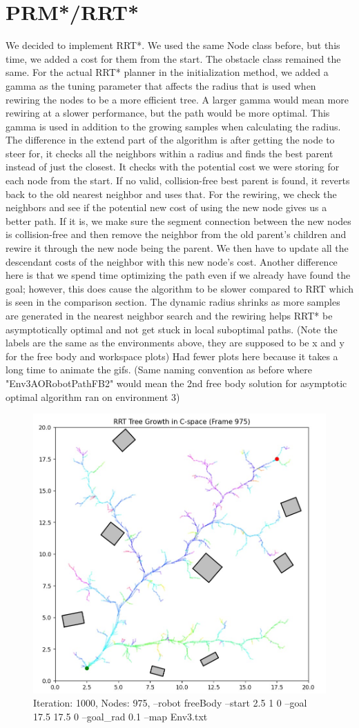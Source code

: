 \documentclass{article}
\begin{document}
\section{PRM*/RRT*}
We decided to implement RRT*. We used the same Node class before, but this time, we added a cost for them from the start. The obstacle class remained the same. For the actual RRT* planner in the initialization method, we added a gamma as the tuning parameter that affects the radius that is used when rewiring the nodes to be a more efficient tree. A larger gamma would mean more rewiring at a slower performance, but the path would be more optimal. This gamma is used in addition to the growing samples when calculating the radius. The difference in the extend part of the algorithm is after getting the node to steer for, it checks all the neighbors within a radius and finds the best parent instead of just the closest. It checks with the potential cost we were storing for each node from the start. If no valid, collision-free best parent is found, it reverts back to the old nearest neighbor and uses that. For the rewiring, we check the neighbors and see if the potential new cost of using the new node gives us a better path. If it is, we make sure the segment connection between the new nodes is collision-free and then remove the neighbor from the old parent's children and rewire it through the new node being the parent. We then have to update all the descendant costs of the neighbor with this new node's cost. Another difference here is that we spend time optimizing the path even if we already have found the goal; however, this does cause the algorithm to be slower compared to RRT which is seen in the comparison section. The dynamic radius shrinks as more samples are generated in the nearest neighbor search and the rewiring helps RRT* be asymptotically optimal and not get stuck in local suboptimal paths. 
(Note the labels are the same as the environments above, they are supposed to be x and y for the free body and workspace plots) Had fewer plots here because it takes a long time to animate the gifs. (Same naming convention as before where "Env3AORobotPathFB2" would mean the 2nd free body solution for asymptotic optimal algorithm ran on environment 3)

\begin{figure} [H]
    \centering
    \includegraphics[width=0.5\linewidth]{latex_media/Env3AOTreeGrowthFB1.jpg}
    \caption{Iteration: 1000, Nodes: 975, --robot freeBody --start 2.5 1 0 --goal 17.5 17.5 0 --goal\_rad 0.1 --map Env3.txt}
\end{figure}
\end{document}
